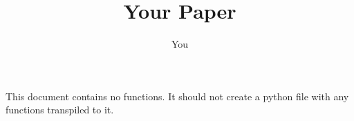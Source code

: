 \documentclass{article}
\title{Your Paper}
\author{You}
\begin{document}
This document contains no functions. It should not create a python file with any functions transpiled to it.
\end{document}

